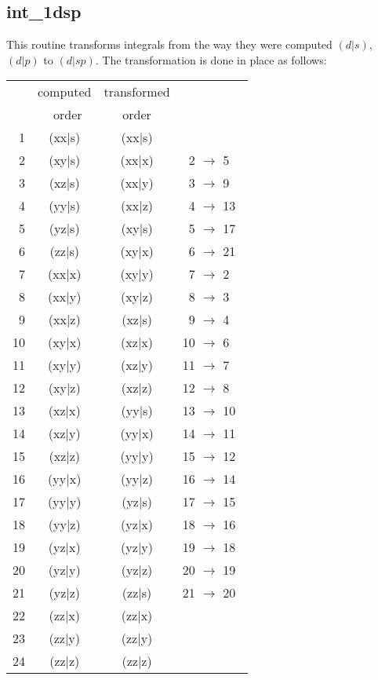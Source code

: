\subsection{int\_1dsp} 
This routine transforms integrals from the way they 
were computed $(d|s)$, $(d|p)$ to $(d|sp)$. 
The transformation is done in place as follows: 
\begin{tabular}{rccc}       
  &  computed  & transformed & \\ 
  &  ~order    &  order & \\ 
~1 & (xx|s)  &  (xx|s)  & \\ 
~2 & (xy|s)  &  (xx|x)  &  ~2 $\rightarrow$ 5~~ \\ 
~3 & (xz|s)  &  (xx|y)  &  ~3 $\rightarrow$ 9~~ \\ 
~4 & (yy|s)  &  (xx|z)  &  ~4 $\rightarrow$ 13~ \\ 
~5 & (yz|s)  &  (xy|s)  &  ~5 $\rightarrow$ 17~ \\ 
~6 & (zz|s)  &  (xy|x)  &  ~6 $\rightarrow$ 21~ \\ 
~7 & (xx|x)  &  (xy|y)  &  ~7 $\rightarrow$ 2~~ \\ 
~8 & (xx|y)  &  (xy|z)  &  ~8 $\rightarrow$ 3~~ \\ 
~9 & (xx|z)  &  (xz|s)  &  ~9 $\rightarrow$ 4~~ \\ 
10 & (xy|x)  &  (xz|x)  &  10 $\rightarrow$ 6~~ \\ 
11 & (xy|y)  &  (xz|y)  &  11 $\rightarrow$ 7~~ \\ 
12 & (xy|z)  &  (xz|z)  &  12 $\rightarrow$ 8~~ \\ 
13 & (xz|x)  &  (yy|s)  &  13 $\rightarrow$ 10~ \\ 
14 & (xz|y)  &  (yy|x)  &  14 $\rightarrow$ 11~ \\ 
15 & (xz|z)  &  (yy|y)  &  15 $\rightarrow$ 12~ \\ 
16 & (yy|x)  &  (yy|z)  &  16 $\rightarrow$ 14~ \\ 
17 & (yy|y)  &  (yz|s)  &  17 $\rightarrow$ 15~ \\ 
18 & (yy|z)  &  (yz|x)  &  18 $\rightarrow$ 16~ \\ 
19 & (yz|x)  &  (yz|y)  &  19 $\rightarrow$ 18~ \\ 
20 & (yz|y)  &  (yz|z)  &  20 $\rightarrow$ 19~ \\ 
21 & (yz|z)  &  (zz|s)  &  21 $\rightarrow$ 20~ \\ 
22 & (zz|x)  &  (zz|x)  & \\ 
23 & (zz|y)  &  (zz|y)  & \\ 
24 & (zz|z)  &  (zz|z)  & \\ 
\end{tabular} 
 
